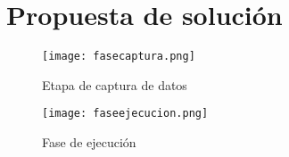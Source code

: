 \newpage
\section{Propuesta de solución}

\begin{figure}[htb]
	\centering
	\texttt{[image: fasecaptura.png]}
	\caption{Etapa de captura de datos}
\end{figure}

\begin{figure}[htb]
	\centering
	\texttt{[image: faseejecucion.png]}
	\caption{Fase de ejecución}
\end{figure}